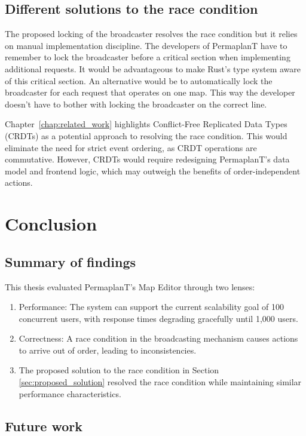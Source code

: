 \documentclass[final,oneside]{vutinfth}
\begin{document}
\section{Different solutions to the race condition}

The proposed locking of the broadcaster resolves the race condition but it relies on manual implementation discipline.
The developers of PermaplanT have to remember to lock the broadcaster before a critical section when implementing additional requests.
It would be advantageous to make Rust's type system aware of this critical section.
An alternative would be to automatically lock the broadcaster for each request that operates on one map.
This way the developer doesn't have to bother with locking the broadcaster on the correct line.

Chapter~\ref{chap:related_work} highlights Conflict-Free Replicated Data Types (CRDTs) as a potential approach to resolving the race condition.
This would eliminate the need for strict event ordering, as CRDT operations are commutative.
However, CRDTs would require redesigning PermaplanT’s data model and frontend logic, which may outweigh the benefits of order-independent actions.

\chapter{Conclusion}\label{chap:conclusion}

\section{Summary of findings}

This thesis evaluated PermaplanT's Map Editor through two lenses:
\begin{enumerate}
    \item Performance: The system can support the current scalability goal of 100 concurrent users, with response times degrading gracefully until 1,000 users.
    \item Correctness: A race condition in the broadcasting mechanism causes actions to arrive out of order, leading to inconsistencies.
    \item The proposed solution to the race condition in Section \ref{sec:proposed_solution} resolved the race condition while maintaining similar performance characteristics.
\end{enumerate}

\section{Future work}
\end{document}
